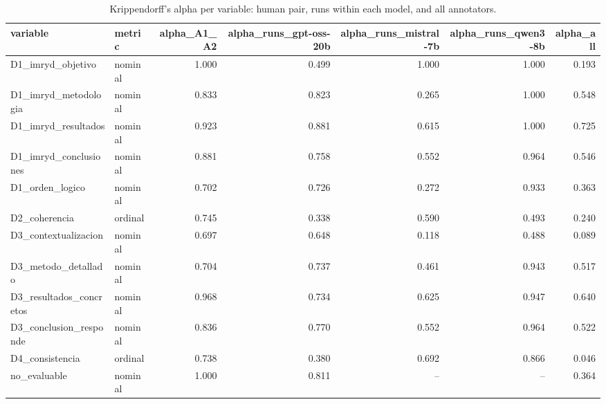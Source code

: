 \begin{table}
\caption{Krippendorff's alpha per variable: human pair, runs within each model, and all annotators.}
\label{tab:krippendorff}
\begin{tabular}{llrrrrr}
\toprule
variable & metric & alpha\_A1\_A2 & alpha\_runs\_gpt-oss-20b & alpha\_runs\_mistral-7b & alpha\_runs\_qwen3-8b & alpha\_all \\
\midrule
D1\_imryd\_objetivo & nominal & 1.000 & 0.499 & 1.000 & 1.000 & 0.193 \\
D1\_imryd\_metodologia & nominal & 0.833 & 0.823 & 0.265 & 1.000 & 0.548 \\
D1\_imryd\_resultados & nominal & 0.923 & 0.881 & 0.615 & 1.000 & 0.725 \\
D1\_imryd\_conclusiones & nominal & 0.881 & 0.758 & 0.552 & 0.964 & 0.546 \\
D1\_orden\_logico & nominal & 0.702 & 0.726 & 0.272 & 0.933 & 0.363 \\
D2\_coherencia & ordinal & 0.745 & 0.338 & 0.590 & 0.493 & 0.240 \\
D3\_contextualizacion & nominal & 0.697 & 0.648 & 0.118 & 0.488 & 0.089 \\
D3\_metodo\_detallado & nominal & 0.704 & 0.737 & 0.461 & 0.943 & 0.517 \\
D3\_resultados\_concretos & nominal & 0.968 & 0.734 & 0.625 & 0.947 & 0.640 \\
D3\_conclusion\_responde & nominal & 0.836 & 0.770 & 0.552 & 0.964 & 0.522 \\
D4\_consistencia & ordinal & 0.738 & 0.380 & 0.692 & 0.866 & 0.046 \\
no\_evaluable & nominal & 1.000 & 0.811 & -- & -- & 0.364 \\
\bottomrule
\end{tabular}
\end{table}
